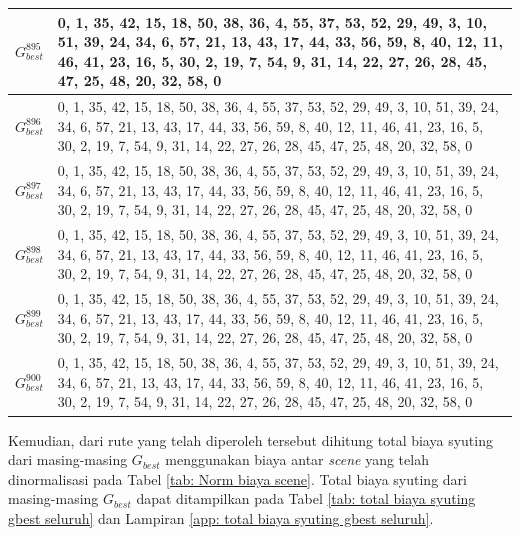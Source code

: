 {{{\begin{tabularx}{\textwidth}{|c|p{11cm}|}
    $G_{best}^{895}$ & 0, 1, 35, 42, 15, 18, 50, 38, 36, 4, 55, 37, 53, 52, 29, 49, 3, 10, 51,   39, 24, 34, 6, 57, 21, 13, 43, 17, 44, 33, 56, 59, 8, 40, 12, 11, 46, 41, 23,   16, 5, 30, 2, 19, 7, 54, 9, 31, 14, 22, 27, 26, 28, 45, 47, 25, 48, 20, 32,   58, 0 \\ \hline
    $G_{best}^{896}$ & 0, 1, 35, 42, 15, 18, 50, 38, 36, 4, 55, 37, 53, 52, 29, 49, 3, 10, 51,   39, 24, 34, 6, 57, 21, 13, 43, 17, 44, 33, 56, 59, 8, 40, 12, 11, 46, 41, 23,   16, 5, 30, 2, 19, 7, 54, 9, 31, 14, 22, 27, 26, 28, 45, 47, 25, 48, 20, 32,   58, 0 \\ \hline
    $G_{best}^{897}$ & 0, 1, 35, 42, 15, 18, 50, 38, 36, 4, 55, 37, 53, 52, 29, 49, 3, 10, 51,   39, 24, 34, 6, 57, 21, 13, 43, 17, 44, 33, 56, 59, 8, 40, 12, 11, 46, 41, 23,   16, 5, 30, 2, 19, 7, 54, 9, 31, 14, 22, 27, 26, 28, 45, 47, 25, 48, 20, 32,   58, 0 \\ \hline
    $G_{best}^{898}$ & 0, 1, 35, 42, 15, 18, 50, 38, 36, 4, 55, 37, 53, 52, 29, 49, 3, 10, 51,   39, 24, 34, 6, 57, 21, 13, 43, 17, 44, 33, 56, 59, 8, 40, 12, 11, 46, 41, 23,   16, 5, 30, 2, 19, 7, 54, 9, 31, 14, 22, 27, 26, 28, 45, 47, 25, 48, 20, 32,   58, 0 \\ \hline
    $G_{best}^{899}$ & 0, 1, 35, 42, 15, 18, 50, 38, 36, 4, 55, 37, 53, 52, 29, 49, 3, 10, 51,   39, 24, 34, 6, 57, 21, 13, 43, 17, 44, 33, 56, 59, 8, 40, 12, 11, 46, 41, 23,   16, 5, 30, 2, 19, 7, 54, 9, 31, 14, 22, 27, 26, 28, 45, 47, 25, 48, 20, 32,   58, 0 \\ \hline
    $G_{best}^{900}$ & 0, 1, 35, 42, 15, 18, 50, 38, 36, 4, 55, 37, 53, 52, 29, 49, 3, 10, 51,   39, 24, 34, 6, 57, 21, 13, 43, 17, 44, 33, 56, 59, 8, 40, 12, 11, 46, 41, 23,   16, 5, 30, 2, 19, 7, 54, 9, 31, 14, 22, 27, 26, 28, 45, 47, 25, 48, 20, 32,   58, 0 \\ \hline
\end{tabularx}
}

Kemudian, dari rute yang telah diperoleh tersebut dihitung total biaya syuting dari masing-masing $G_{best}$ menggunakan biaya antar \textit{scene} yang telah dinormalisasi pada Tabel \ref{tab: Norm biaya scene}.
Total biaya syuting dari masing-masing $G_{best}$ dapat ditampilkan pada Tabel \ref{tab: total biaya syuting gbest seluruh} dan Lampiran \ref{app: total biaya syuting gbest seluruh}.

}}
